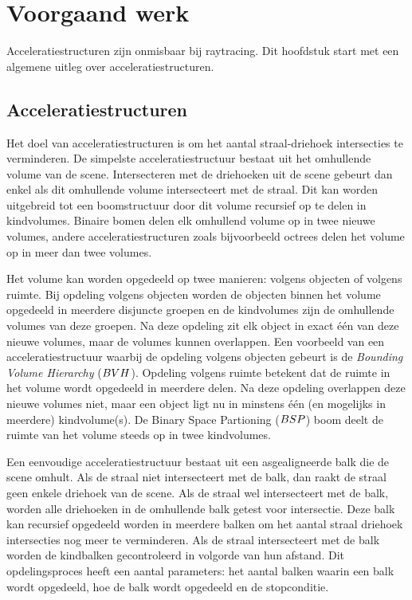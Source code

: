 \chapter{Voorgaand werk}
\label{hoofdstuk:voorgaand-werk}
Acceleratiestructuren zijn onmisbaar bij raytracing.
Dit hoofdstuk start met een algemene uitleg over acceleratiestructuren.

\section{Acceleratiestructuren}
    Het doel van acceleratiestructuren is om het aantal straal-driehoek intersecties te verminderen.
    De simpelste acceleratiestructuur bestaat uit het omhullende volume van de scene.
    Intersecteren met de driehoeken uit de scene gebeurt dan enkel als dit omhullende volume intersecteert met de straal.
    Dit kan worden uitgebreid tot een boomstructuur door dit volume recursief op te delen in kindvolumes.
    Binaire bomen delen elk omhullend volume op in twee nieuwe volumes, andere acceleratiestructuren zoals bijvoorbeeld octrees delen het volume op in meer dan twee volumes.
    
    Het volume kan worden opgedeeld op twee manieren: volgens objecten of volgens ruimte.
    Bij opdeling volgens objecten worden de objecten binnen het volume opgedeeld in meerdere disjuncte groepen en de kindvolumes zijn de omhullende volumes van deze groepen.
    Na deze opdeling zit elk object in exact één van deze nieuwe volumes, maar de volumes kunnen overlappen.
    Een voorbeeld van een acceleratiestructuur waarbij de opdeling volgens objecten gebeurt is de \textit{Bounding Volume Hierarchy} ($BVH$).
    Opdeling volgens ruimte betekent dat de ruimte in het volume wordt opgedeeld in meerdere delen.
    Na deze opdeling overlappen deze nieuwe volumes niet, maar een object ligt nu in minstens één (en mogelijks in meerdere) kindvolume(s).
    De Binary Space Partioning ($BSP$) boom deelt de ruimte van het volume steeds op in twee kindvolumes.

    Een eenvoudige acceleratiestructuur bestaat uit een asgealigneerde balk die de scene omhult. 
    Als de straal niet intersecteert met de balk, dan raakt de straal geen enkele driehoek van de scene.
    Als de straal wel intersecteert met de balk, worden alle driehoeken in de omhullende balk getest voor intersectie.
    Deze balk kan recursief opgedeeld worden in meerdere balken om het aantal straal driehoek intersecties nog meer te verminderen.
    Als de straal intersecteert met de balk worden de kindbalken gecontroleerd in volgorde van hun afstand.
    Dit opdelingsproces heeft een aantal parameters: het aantal balken waarin een balk wordt opgedeeld, hoe de balk wordt opgedeeld en de stopconditie. \\

